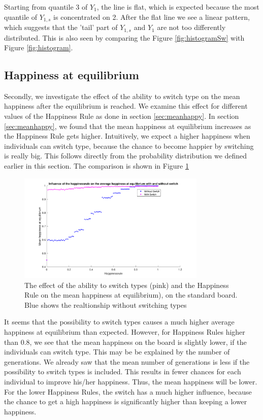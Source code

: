 Starting from quantile 3 of $Y_1$, the line is flat, which is expected because the most quantile of $Y_{1,s}$ is concentrated on 2. After the flat line we see a linear pattern, which suggests that the 'tail' part of $Y_{1,s}$ and $Y_1$ are not too differently distributed. This is also seen by comparing the Figure \ref{fig:histogramSw} with Figure \ref{fig:histogram}.

\subsection{Happiness at equilibrium}

Secondly, we investigate the effect of the ability to switch type on the mean happiness after the equilibrium is reached.
We examine this effect for different values of the Happiness Rule as done in section \ref{sec:meanhappy}.
In section \ref{sec:meanhappy}, we found that the mean happiness at equilibrium increases as the Happiness Rule gets higher.
Intuitively, we expect a higher happiness when individuals can switch type, because the chance to become happier by switching is really big.
This follows directly from the probability distribution we defined earlier in this section. The comparison is shown in Figure \ref{fig:meanhappyswitch}

\begin{figure}[H]
    \centering
    \includegraphics[width=0.8\textwidth]{happinessrule-meanhappiness-switch.pdf}
    \caption{The effect of the ability to switch types (pink) and the Happiness Rule on the mean happiness at equilibrium), on the standard board. Blue shows the realtionship without switching types}
    \label{fig:meanhappyswitch}
\end{figure}

It seems that the possibility to switch types causes a much higher average happiness at equilibrium than expected.
However, for Happiness Rules higher than $0.8$, we see that the mean happiness on the board is slightly lower, if the individuals can switch type.
This may be be explained by the number of generations.
We already saw that the mean number of generations is less if the possibility to switch types is included.
This results in fewer chances for each individual to improve his/her happiness.
Thus, the mean happiness will be lower.
For the lower Happiness Rules, the switch has a much higher influence, because the chance to get a high happiness is significantly higher than keeping a lower happiness.

